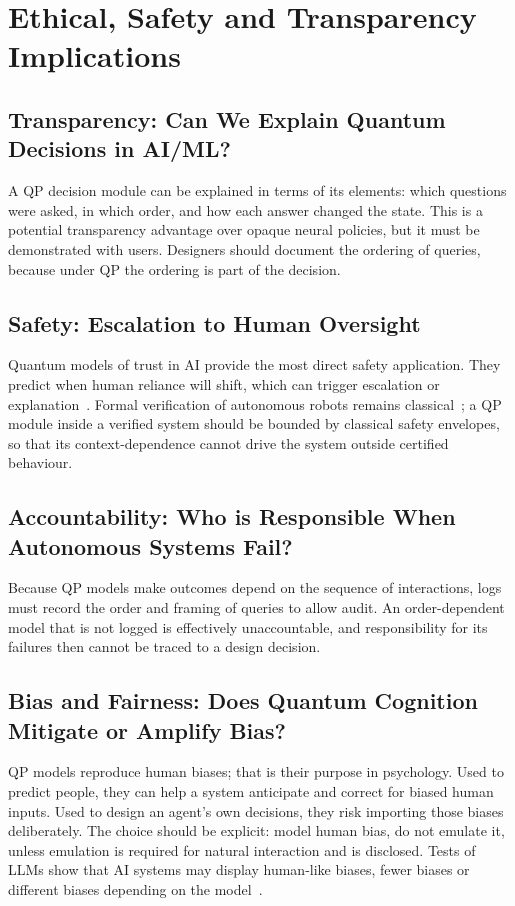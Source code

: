 \documentclass[pdflatex,sn-basic]{sn-jnl}
\begin{document}
\section{Ethical, Safety and Transparency Implications}\label{sec:ethics}

\subsection{Transparency: Can We Explain Quantum Decisions in AI/ML?}\label{sec:transparency}
A QP decision module can be explained in terms of its elements: which questions were asked, in which order, and how each answer changed the state. This is a potential transparency advantage over opaque neural policies, but it must be demonstrated with users. Designers should document the ordering of queries, because under QP the ordering is part of the decision.

\subsection{Safety: Escalation to Human Oversight}\label{sec:safety}
Quantum models of trust in AI provide the most direct safety application. They predict when human reliance will shift, which can trigger escalation or explanation~\citep{Roeder2023,Humr2025,Humr2026,vanderMeer2025}. Formal verification of autonomous robots remains classical~\citep{Luckcuck2019,Dreossi2019}; a QP module inside a verified system should be bounded by classical safety envelopes, so that its context-dependence cannot drive the system outside certified behaviour.

\subsection{Accountability: Who is Responsible When Autonomous Systems Fail?}\label{sec:accountability}
Because QP models make outcomes depend on the sequence of interactions, logs must record the order and framing of queries to allow audit. An order-dependent model that is not logged is effectively unaccountable, and responsibility for its failures then cannot be traced to a design decision.

\subsection{Bias and Fairness: Does Quantum Cognition Mitigate or Amplify Bias?}\label{sec:bias}
QP models reproduce human biases; that is their purpose in psychology. Used to predict people, they can help a system anticipate and correct for biased human inputs. Used to design an agent's own decisions, they risk importing those biases deliberately. The choice should be explicit: model human bias, do not emulate it, unless emulation is required for natural interaction and is disclosed. Tests of LLMs show that AI systems may display human-like biases, fewer biases or different biases depending on the model~\citep{Binz2023,Tjuatja2024,Imannezhad2026}.
\end{document}
